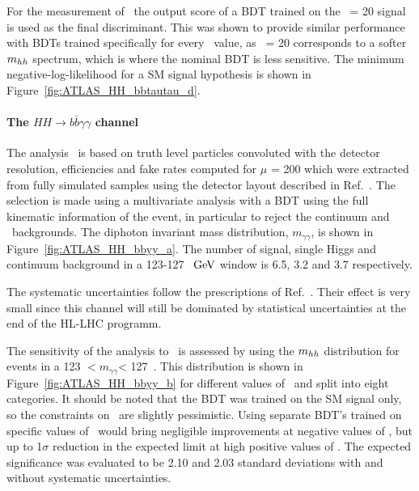 For the measurement of \kl\ the output score of a BDT trained on the \kl\ = 20 signal is used as the final discriminant. This was shown to provide similar performance with BDTs trained specifically for every \kl\ value, as \kl\ = 20 corresponds to a softer $m_{hh}$ spectrum, which is where the nominal BDT is less sensitive.
The minimum negative-log-likelihood for a SM signal hypothesis is shown in Figure~\ref{fig:ATLAS_HH_bbtautau_d}.




%
\paragraph{The $HH \rightarrow b\bar{b}\gamma\gamma$ channel}


The analysis~\cite{ATLASHHPUBnote} is based on truth level particles convoluted with the detector resolution, efficiencies and fake rates computed for $\mu$ = 200 which were extracted from fully simulated samples using the detector layout described in Ref.~\cite{ITKPixelTDR}. The selection is made using a multivariate analysis with a BDT using the full kinematic information of the event, in particular to reject the continuum and \ttH\ backgrounds. 
The diphoton invariant mass distribution, $\ensuremath{m_{\gamma\gamma}}$, is shown in Figure~\ref{fig:ATLAS_HH_bbyy_a}. The number of signal, single Higgs and continuum background in a 123-127~$~\text{GeV}$ window is 6.5, 3.2 and 3.7 respectively.

The systematic uncertainties follow the prescriptions of Ref.~\cite{ATLASperfPUBnote}. Their effect is very small since this channel will still be dominated by statistical uncertainties at the end of the HL-LHC programm.


The sensitivity of the analysis to \kl\ is assessed by using the $m_{hh}$ distribution for events in a 123 $ < \ensuremath{m_{\gamma\gamma}} $< 127~\UGeV. This distribution is shown in Figure~\ref{fig:ATLAS_HH_bbyy_b} for different values of \kl\ and split into eight categories. It should be noted that the BDT was trained on the SM signal only, so the constraints on \kl\ are slightly pessimistic. Using separate BDT's trained on specific values of \kl\ would bring negligible improvements at negative values of \kl, but up to 1$\sigma$ reduction in the expected limit at high positive values of \kl.
The expected significance was evaluated to be 2.10 and 2.03 standard deviations with and without systematic uncertainties.

